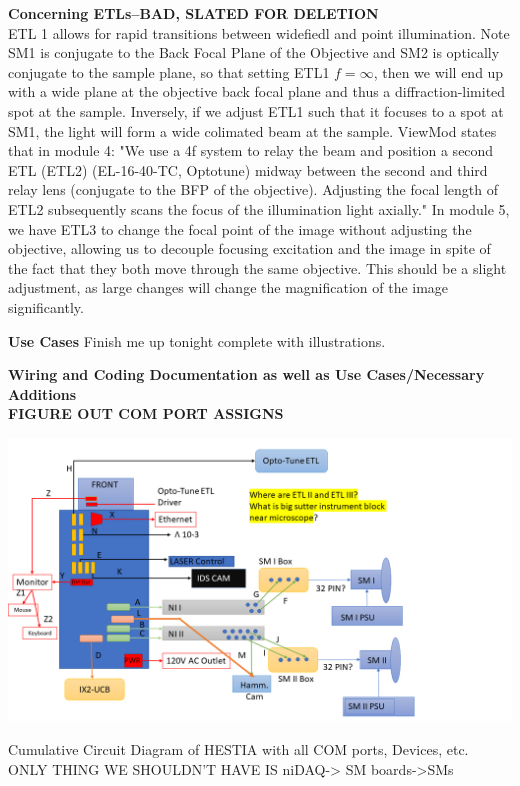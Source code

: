\newpage
\textbf{Concerning ETLs--BAD, SLATED FOR DELETION}\\
    ETL 1 allows for rapid transitions between widefiedl and point illumination. Note SM1 is conjugate to the Back Focal Plane of the Objective and SM2 is optically conjugate to the sample plane, so that setting ETL1 $f=\infty$, then we will end up with a wide plane at the objective back focal plane and thus a diffraction-limited spot at the sample. Inversely, if we adjust ETL1 such that it focuses to a spot at SM1, the light will form a wide colimated beam at the sample. ViewMod states that in module 4:
"We use a 4f system to
relay the beam and position a second ETL (ETL2) (EL-16-40-TC, Optotune) midway
between the second and third relay lens (conjugate to the BFP of the objective). Adjusting the
focal length of ETL2 subsequently scans the focus of the illumination light axially." 
In module 5, we have ETL3 to change the focal point of the image without adjusting the objective, allowing us to decouple focusing excitation and the image in spite of the fact that they both move through the same objective. This should be a slight adjustment, as large changes will change the magnification of the image significantly.
\begin{center}
    \textbf{Use Cases}
    Finish me up tonight complete with illustrations.
\end{center}
\newpage
\begin{center}
    \textbf{Wiring and Coding Documentation as well as Use Cases/Necessary Additions\\ FIGURE OUT COM PORT ASSIGNS}
\end{center}
\includegraphics[width=\textwidth]{Hestia_wiring_img_1-9-23.png}


\newpage
\begin{center}
    Cumulative Circuit Diagram of HESTIA with all COM ports, Devices, etc. ONLY THING WE SHOULDN'T HAVE IS niDAQ-> SM boards->SMs
\end{center}


